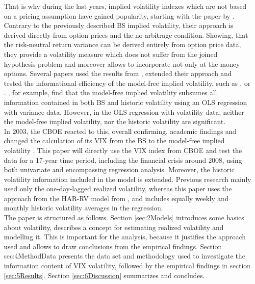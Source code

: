 That is why during the last years, implied volatility indexes which are not based on a pricing assumption have gained popularity, starting with the paper by \textcite{britten2000}. Contrary to the previously described \ac{BS} implied volatility, their approach is derived directly from option prices and the no-arbitrage condition. Showing, that the risk-neutral return variance can be derived entirely from option price data, they provide a volatility measure which does not suffer from the joined hypothesis problem and moreover allows to incorporate not only at-the-money options.
Several papers used the results from \textcite{britten2000}, extended their approach and tested the informational efficiency of the model-free implied volatility, such as \textcite{bakanova2010}, \textcite{taylor2010} or \textcite{jiang2003}. \textcite{jiang2003}, for example, find that the model-free implied volatility subsumes all information contained in both \ac{BS} and historic volatility using an OLS regression with variance data. However, in the OLS regression with volatility data, neither the model-free implied volatility, nor the historic volatility are significant.\\
In 2003, the \ac{CBOE} reacted to this, overall confirming, academic findings and changed the calculation of its \ac{VIX} from the \ac{BS} to the model-free implied volatility \parencite{whaley1995}. This paper will directly use the \ac{VIX} index from \ac{CBOE} and test the data for a 17-year time period, including the financial crisis around 2008, using both univariate and encompassing regression analysis. Moreover, the historic volatility information included in the model is extended. Previous research mainly used only the one-day-lagged realized volatility, whereas this paper uses the approach from the HAR-RV model from \textcite{corsi2009}, and includes equally weekly and monthly historic volatility averages in the regression. \\
The paper is structured as follows. Section \ref{sec:2Models} introduces some basics about volatility, describes a concept for estimating realized volatility and modelling it. This is important for the analysis, because it justifies the approach used and allows to draw conclusions from the empirical findings. Section {sec:4MethodData} presents the data set and methodology used to investigate the information content of \ac{VIX} volatility, followed by the empirical findings in section \ref{sec:5Results}. Section \ref{sec:6Discussion} summarizes and concludes.



